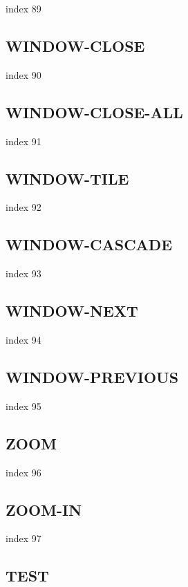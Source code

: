 \documentclass[11pt]{report}
\begin{document}
index 89

\subsection{WINDOW-CLOSE}

index 90

\subsection{WINDOW-CLOSE-ALL}

index 91

\subsection{WINDOW-TILE}

index 92

\subsection{WINDOW-CASCADE}

index 93

\subsection{WINDOW-NEXT}

index 94

\subsection{WINDOW-PREVIOUS}

index 95

\subsection{ZOOM}

 index 96

\subsection{ZOOM-IN}

index 97

\subsection{TEST}
\end{document}
